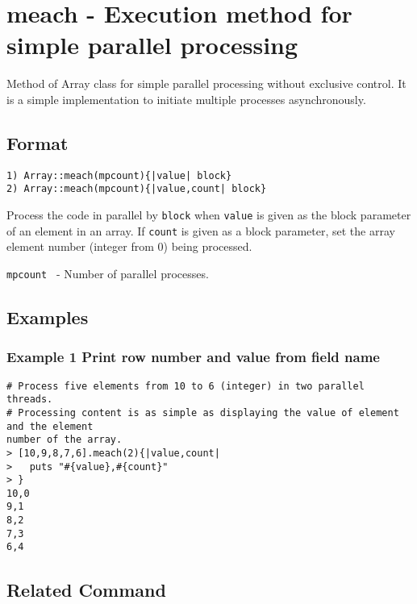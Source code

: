 
%

\section{meach - Execution method for simple parallel processing \label{sect:meachRB}}
Method of Array class for simple parallel processing without exclusive control. 
It is a simple implementation to initiate multiple processes asynchronously.


\subsection{Format}
{\Large
\begin{verbatim}
1) Array::meach(mpcount){|value| block}
2) Array::meach(mpcount){|value,count| block}
\end{verbatim}
} 

Process the code in parallel by \verb|block| when \verb|value| is given as the block parameter of an element in an array. 
If \verb|count| is given as a block parameter, set the array element number (integer from 0) being processed. 


\begin{description}
	\setlength{\itemindent}{-5mm}
	\item {\large \verb/mpcount /} - Number of parallel processes. 
\end{description}


\subsection{Examples}
\subsubsection*{Example 1 Print row number and value from field name}

\begin{Verbatim}[baselinestretch=0.7,frame=single]
# Process five elements from 10 to 6 (integer) in two parallel threads. 
# Processing content is as simple as displaying the value of element and the element 
number of the array. 
> [10,9,8,7,6].meach(2){|value,count|
>   puts "#{value},#{count}"
> }
10,0
9,1
8,2
7,3
6,4
\end{Verbatim}

\subsection{Related Command}

%

